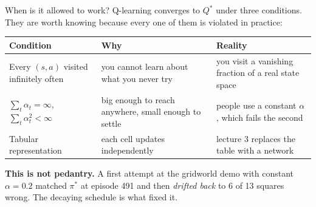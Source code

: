 \documentclass[aspectratio=169]{beamer}
\begin{document}
\begin{frame}{When is it allowed to work?}
  \small
  Q-learning converges to $Q^*$ under three conditions. They are worth knowing because every
  one of them is violated in practice:

  \vskip 8pt
  \begin{center}
  \footnotesize
  \begin{tabular}{p{4.3cm} p{4.0cm} p{4.3cm}}
    \toprule
    \textbf{Condition} & \textbf{Why} & \textbf{Reality} \\
    \midrule
    Every $(s,a)$ visited infinitely often & you cannot learn about what you never try &
      you visit a vanishing fraction of a real state space \\[4pt]
    $\sum_t \alpha_t = \infty$, $\sum_t \alpha_t^2 < \infty$ &
      big enough to reach anywhere, small enough to settle &
      people use a constant $\alpha$, which fails the second \\[4pt]
    Tabular representation & each cell updates independently &
      lecture 3 replaces the table with a network \\
    \bottomrule
  \end{tabular}
  \end{center}

  \vskip 8pt
  \begin{tcolorbox}[colback=armorange!12, colframe=armorange, boxrule=0.6pt, arc=2pt]
    \small
    \textbf{This is not pedantry.} A first attempt at the gridworld demo with constant
    $\alpha = 0.2$ matched $\pi^*$ at episode 491 and then \emph{drifted back} to 6 of 13
    squares wrong. The decaying schedule is what fixed it.
  \end{tcolorbox}
\end{frame}
\end{document}
